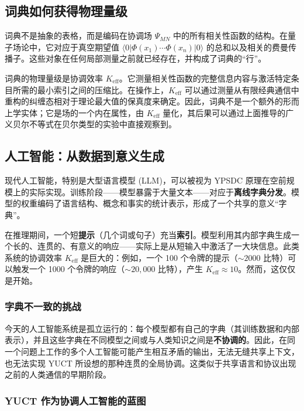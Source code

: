 \documentclass[12pt,a4paper]{article}
\theoremstyle{remark}
\newcommand{\Keff}{K_{\mathrm{eff}}}
\begin{document}
\subsection*{词典如何获得物理量级}

词典不是抽象的表格，而是编码在协调场 \(\Psi_{MN}\) 中的所有相关性函数的结构。在量子场论中，它对应于真空期望值 \(\langle 0|\Phi(x_1)\cdots\Phi(x_n)|0\rangle\) 的总和以及相关的费曼传播子。这些对象在任何局部测量之前就已经存在，并构成了词典的“行”。

词典的物理量级是协调效率 \(K_{\mathrm{eff}}\)。它测量相关性函数的完整信息内容与激活特定条目所需的最小索引之间的压缩比。在操作上，\(K_{\mathrm{eff}}\) 可以通过测量从有限经典通信中重构的纠缠态相对于理论最大值的保真度来确定。因此，词典不是一个额外的形而上学实体；它是场的一个内在属性，由 \(K_{\mathrm{eff}}\) 量化，其后果可以通过上面推导的广义贝尔不等式在贝尔类型的实验中直接观察到。
	
	\subsection{人工智能：从数据到意义生成}
	
	现代人工智能，特别是大型语言模型 (LLM)，可以被视为 YPSDC 原理在空前规模上的实际实现。训练阶段——模型暴露于大量文本——对应于\textbf{离线字典分发}。模型的权重编码了语言结构、概念和事实的统计表示，形成了一个共享的意义“字典”。
	
	在推理期间，一个短\textbf{提示}（几个词或句子）充当\textbf{索引}。模型利用其内部字典生成一个长的、连贯的、有意义的响应——实际上是从短输入中激活了一大块信息。此类系统的协调效率 $\Keff$ 是巨大的：例如，一个 100 个令牌的提示（$\sim 2000$ 比特）可以触发一个 1000 个令牌的响应（$\sim 20,000$ 比特），产生 $\Keff \approx 10$。然而，这仅仅是开始。
	
	\subsubsection{字典不一致的挑战}
	
	今天的人工智能系统是孤立运行的：每个模型都有自己的字典（其训练数据和内部表示），并且这些字典在不同模型之间或与人类知识之间是\textbf{不协调的}。因此，在同一个问题上工作的多个人工智能可能产生相互矛盾的输出，无法无缝共享上下文，也无法实现 YUCT 所设想的那种连贯的全局协调。这类似于共享语言和协议出现之前的人类通信的早期阶段。
	
	\subsubsection{YUCT 作为协调人工智能的蓝图}
	
\end{document}
